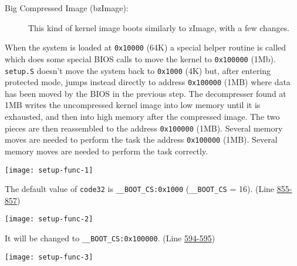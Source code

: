 \begin{enumerate}
\begin{description}
\begin{description}
    \item[Big Compressed Image (bzImage):] This kind of kernel image boots similarly to
      zImage, with a few changes.
    \end{description}
    When the system is loaded at \texttt{0x10000} (64K) a special helper routine is called
    which does some special BIOS calls to move the kernel to \texttt{0x100000}
    (1Mb). \texttt{setup.S} doesn't move the system back to \texttt{0x1000} (4K) but, after
    entering protected mode, jumps instead directly to address \texttt{0x100000} (1MB) where
    data has been moved by the BIOS in the previous step.  The decompresser found at 1MB
    writes the uncompressed kernel image into low memory until it is exhausted, and then
    into high memory after the compressed image.  The two pieces are then reassembled to
    the address \texttt{0x100000} (1MB). Several memory moves are needed to perform the task
    the address \texttt{0x100000} (1MB). Several memory moves are needed to perform the task
    correctly.
  \end{description}

  \begin{center}
    \texttt{[image: setup-func-1]}
  \end{center}

  The default value of \texttt{code32} is \texttt{\_\_BOOT\_CS:0x1000} (\texttt{\_\_BOOT\_CS} =
  16). (Line
  \href{http://lxr.linux.no/linux+v2.6.11/arch/i386/boot/setup.S\#L855}{855-857})

  \begin{center}
    \texttt{[image: setup-func-2]}
  \end{center}

  It will be changed to \texttt{\_\_BOOT\_CS:0x100000}.
  (Line \href{http://lxr.linux.no/linux+v2.6.11/arch/i386/boot/setup.S\#L594}{594-595})
    
  \begin{center}
    \texttt{[image: setup-func-3]}
  \end{center}


\end{enumerate}

